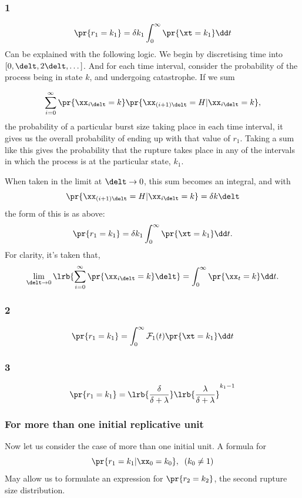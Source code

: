 \subsubsection*{1}

$$\pr{r_1 = k_1} = \delta k_1\int_0^{\infty}{\pr{\xt = k_1}}\dd t$$
Can be explained with the following logic. 
We begin by discretising time into $[0,\delt , 2 \delt , \dots]$. And for each time interval, consider the probability of the process being in state $k$, and undergoing catastrophe. If we sum 

$$\sum_{i=0}^\infty \pr{\xx_{i\delt} = k}\pr{\xx_{(i+1)\delt} = H|\xx_{i\delt} = k},$$
the probability of a particular burst size taking place in each time interval, it gives us the overall probability of ending up with that value of $r_1$. Taking a sum like this gives the probability that the rupture takes place in any of the intervals in which the process is at the particular state, $k_1$.\par
When taken in the limit at $\delt \to 0$, this sum becomes an integral, and with 
$$\pr{\xx_{(i+1)\delt} = H|\xx_{i\delt} = k} = \delta k \delt$$
the form of this is as above:
$$\pr{r_1 = k_1} = \delta k_1\int_0^{\infty}{\pr{\xt = k_1}}\dd t.$$
For clarity, it's taken that,
$$\lim_{\delt\to0}\lrb{\sum^\infty_{i=0} \pr{\xx_{i\delt} = k} \delt} = \int^{\infty}_0  \pr{\xx_{t} = k} \dd t.$$


\subsubsection*{2}
$$\pr{r_1 = k_1} = \int_0^{\infty}{\mathcal{F}_{1}(t)\pr{\xt = k_1}}\dd t$$


\subsubsection*{3}

$$\pr{r_1 = k_1} =  \lrb{\frac{\delta}{\delta + \lambda}} \lrb{\frac{\lambda}{\delta + \lambda}}^{k_1-1}$$


\subsubsection*{For more than one initial replicative unit}

Now let us consider the case of more than one initial unit. A formula for 
$$\pr{r_1 = k_1| \xx_0 = k_0}, \;\; (k_0\neq 1)$$
May allow us to formulate an expression for $\pr{r_2 = k_2}$, the second rupture size distribution.


